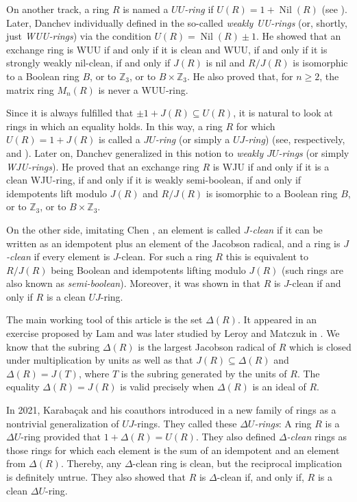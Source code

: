 \documentclass[12pt]{amsart}
\theoremstyle{definition}
\begin{document}
On another track, a ring \(R\) is named a {\it \(UU\)-ring} if \(U(R)=1+\operatorname{Nil}(R)\) (see \cite{12}). Later, Danchev individually defined in \cite{wuu} the so-called {\it weakly UU-rings} (or, shortly, just {\it WUU-rings}) via the condition \(U(R) = \operatorname{Nil}(R) \pm 1\). He showed that an exchange ring is WUU if and only if it is clean and WUU, if and only if it is strongly weakly nil-clean, if and only if \(J(R)\) is nil and \(R/J(R)\) is isomorphic to a Boolean ring \(B\), or to \(\mathbb{Z}_3\), or to \(B \times \mathbb{Z}_3\). He also proved that, for \(n \ge 2\), the matrix ring \(M_n(R)\) is never a WUU-ring.
	
Since it is always fulfilled that \(\pm 1 + J(R) \subseteq U(R)\), it is natural to look at rings in which an equality holds. In this way, a ring $R$ for which \(U(R) = 1 + J(R)\) is called a {\it \(JU\)-ring} (or simply a {\it \(UJ\)-ring}) (see, respectively, \cite{D} and \cite{14}). Later on, Danchev generalized in \cite{wuj} this notion to {\it weakly \(JU\)-rings} (or simply {\it WJU-rings}). He proved that an exchange ring \(R\) is WJU if and only if it is a clean WJU-ring, if and only if it is weakly semi-boolean, if and only if idempotents lift modulo \(J(R)\) and \(R/J(R)\) is isomorphic to a Boolean ring \(B\), or to \(\mathbb{Z}_3\), or to \(B \times \mathbb{Z}_3\).
	
On the other side, imitating Chen \cite{16}, an element is called {\it \(J\)-clean} if it can be written as an idempotent plus an element of the Jacobson radical, and a ring is {\it \(J\)-clean} if every element is \(J\)-clean. For such a ring $R$ this is equivalent to \(R/J(R)\) being Boolean and idempotents lifting modulo \(J(R)\) (such rings are also known as {\it semi-boolean}). Moreover, it was shown in \cite{16} that \(R\) is \(J\)-clean if and only if \(R\) is a clean \(UJ\)-ring.
	
The main working tool of this article is the set \(\Delta(R)\). It appeared in an exercise proposed by Lam \cite{23, lam} and was later studied by Leroy and Matczuk in \cite{2}. We know that the subring \(\Delta(R)\) is the largest Jacobson radical of \(R\) which is closed under multiplication by units as well as that \(J(R) \subseteq \Delta(R)\) and \(\Delta(R)=J(T)\), where \(T\) is the subring generated by the units of \(R\). The equality \(\Delta(R)=J(R)\) is valid precisely when \(\Delta(R)\) is an ideal of \(R\).
	
In 2021, Karaba\c{c}ak and his coauthors introduced in \cite{7} a new family of rings as a nontrivial generalization of \(UJ\)-rings. They called these {\it \(\Delta U\)-rings}: A ring \(R\) is a \(\Delta U\)-ring provided that \(1+\Delta(R)=U(R)\). They also defined {\it \(\Delta\)-clean} rings as those rings for which each element is the sum of an idempotent and an element from \(\Delta(R)\). Thereby, any \(\Delta\)-clean ring is clean, but the reciprocal implication is definitely untrue. They also showed that \(R\) is \(\Delta\)-clean if, and only if, \(R\) is a clean \(\Delta U\)-ring.
	
\end{document}
